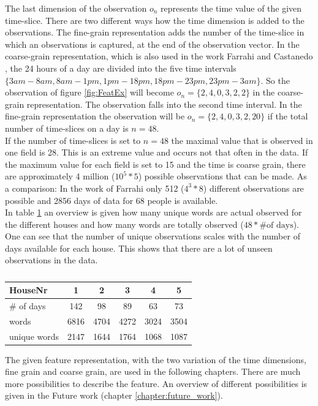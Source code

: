 The last dimension of the observation $o_n$ represents the time value of the given time-slice. There are two different ways how the time dimension is added to the observations. The fine-grain representation adds the number of the time-slice in which an observations is captured, at the end of the observation vector. In the coarse-grain representation, which is also used in the work Farrahi \cite{} and Castanedo \cite{}, the 24 hours of a day are divided into the five time intervals $\{ 3am - 8am, 8am - 1pm, 1pm - 18pm, 18pm - 23pm, 23pm - 3am  \}$. So the observation of figure \ref{fig:FeatEx} will become $o_n=\{2,4,0,3,2,2\}$ in the coarse-grain representation. The observation falls into the second time interval. In the fine-grain representation the observation will be $o_n=\{2,4,0,3,2,20\}$ if the total number of time-slices on a day is $n=48$.\\




If the number of time-slices is set to $n=48$ the maximal value that is observed in one field is 28. This is an extreme value and occurs not that often in the data. If the maximum value for each field is set to 15 and the time is coarse grain, there are approximately 4 million ($10^5*5$) possible observations that can be made. As a comparison: In the work of Farrahi \cite{} only 512 ($4^3*8$) different observations are possible and 2856 days of data for 68 people is available.\\
In table \ref{tab:features} an overview is given how many unique words are actual observed for the different houses and how many words are totally observed ($48*\text{\# of days}$). One can see that the number of unique observations scales with the number of days available for each house. This shows that there are a lot of unseen observations in the data.\\


\begin{table}
 \centering
 \begin{tabular}{l c c c c c}
  HouseNr & 1 & 2 & 3 & 4 & 5\\
  \hline
  \# of days & 142 & 98 & 89 & 63 & 73 \\
  words & 6816 & 4704 & 4272 & 3024 & 3504 \\
  unique words & 2147 & 1644 & 1764 & 1068 & 1087\\
 \end{tabular}
 \caption{}
 \label{tab:features}
\end{table}


The given feature representation, with the two variation of the time dimensions, fine grain and coarse grain, are used in the following chapters. There are much more possibilities to describe the feature. An overview of different possibilities is given in the Future work (chapter \ref{chapter:future_work}).

